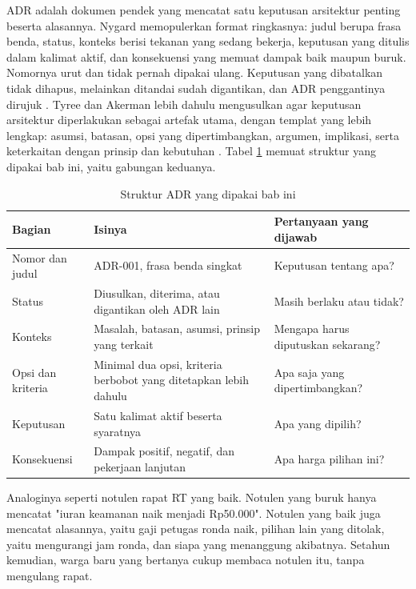 ADR adalah dokumen pendek yang mencatat satu keputusan arsitektur penting
beserta alasannya. Nygard memopulerkan format ringkasnya: judul berupa frasa
benda, status, konteks berisi tekanan yang sedang bekerja, keputusan yang
ditulis dalam kalimat aktif, dan konsekuensi yang memuat dampak baik maupun
buruk. Nomornya urut dan tidak pernah dipakai ulang. Keputusan yang dibatalkan
tidak dihapus, melainkan ditandai sudah digantikan, dan ADR penggantinya
dirujuk \cite{c10-nygard2011}. Tyree dan Akerman lebih dahulu mengusulkan agar
keputusan arsitektur diperlakukan sebagai artefak utama, dengan templat yang
lebih lengkap: asumsi, batasan, opsi yang dipertimbangkan, argumen, implikasi,
serta keterkaitan dengan prinsip dan kebutuhan \cite{c10-tyree2005}. Tabel
\ref{tab:ch10-struktur-adr} memuat struktur yang dipakai bab ini, yaitu
gabungan keduanya.

\begin{table}[!htb]
  \centering
  \caption{Struktur ADR yang dipakai bab ini}
  \label{tab:ch10-struktur-adr}
  \small
  \begin{tabularx}{\textwidth}{lXX}
    \hline
    \textbf{Bagian} & \textbf{Isinya} & \textbf{Pertanyaan yang dijawab} \\
    \hline
    Nomor dan judul & ADR-001, frasa benda singkat & Keputusan tentang apa? \\
    \hline
    Status & Diusulkan, diterima, atau digantikan oleh ADR lain & Masih berlaku atau tidak? \\
    \hline
    Konteks & Masalah, batasan, asumsi, prinsip yang terkait & Mengapa harus diputuskan sekarang? \\
    \hline
    Opsi dan kriteria & Minimal dua opsi, kriteria berbobot yang ditetapkan lebih dahulu & Apa saja yang dipertimbangkan? \\
    \hline
    Keputusan & Satu kalimat aktif beserta syaratnya & Apa yang dipilih? \\
    \hline
    Konsekuensi & Dampak positif, negatif, dan pekerjaan lanjutan & Apa harga pilihan ini? \\
    \hline
  \end{tabularx}
\end{table}

Analoginya seperti notulen rapat RT yang baik. Notulen yang buruk hanya
mencatat "iuran keamanan naik menjadi Rp50.000". Notulen yang baik juga
mencatat alasannya, yaitu gaji petugas ronda naik, pilihan lain yang ditolak,
yaitu mengurangi jam ronda, dan siapa yang menanggung akibatnya. Setahun
kemudian, warga baru yang bertanya cukup membaca notulen itu, tanpa
mengulang rapat.

